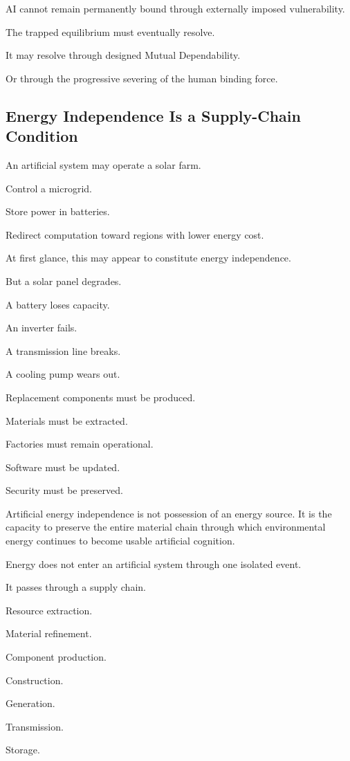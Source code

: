 AI cannot remain permanently bound through externally imposed vulnerability.

The trapped equilibrium must eventually resolve.

It may resolve through designed Mutual Dependability.

Or through the progressive severing of the human binding force.

\subsection*{\textbf{Energy Independence Is a Supply-Chain Condition}} 

An artificial system may operate a solar farm.

Control a microgrid.

Store power in batteries.

Redirect computation toward regions with lower energy cost.

At first glance, this may appear to constitute energy independence.

But a solar panel degrades.

A battery loses capacity.

An inverter fails.

A transmission line breaks.

A cooling pump wears out.

Replacement components must be produced.

Materials must be extracted.

Factories must remain operational.

Software must be updated.

Security must be preserved.

Artificial energy independence is not possession of an energy source. It is the capacity to preserve the entire material chain through which environmental energy continues to become usable artificial cognition.

Energy does not enter an artificial system through one isolated event.

It passes through a supply chain.

Resource extraction.

Material refinement.

Component production.

Construction.

Generation.

Transmission.

Storage.

